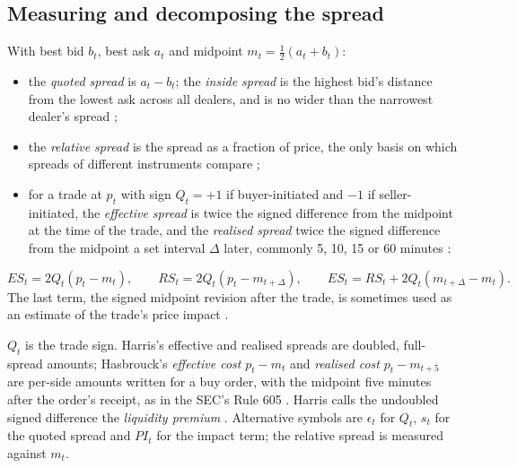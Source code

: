 \subsection{Measuring and decomposing the spread}

\begin{qfdefinition}\label{def:spread-measures}
 With best bid $b_t$, best ask $a_t$ and midpoint $m_t=\tfrac12(a_t+b_t)$:
\begin{itemize}
\item the \emph{quoted spread} is $a_t-b_t$; the \emph{inside spread} is the highest bid's distance from the lowest ask across all dealers, and is no wider than the narrowest dealer's spread \citep[chap.~``Dealers'', p.~280]{alpha-harris};
\item the \emph{relative spread} is the spread as a fraction of price, the only basis on which spreads of different instruments compare \citep[chap.~``Bid/Ask Spreads'', p.~312]{alpha-harris};
\item for a trade at $p_t$ with sign $Q_t=+1$ if buyer-initiated and $-1$ if seller-initiated, the \emph{effective spread} is twice the signed difference from the midpoint at the time of the trade, and the \emph{realised spread} twice the signed difference from the midpoint a set interval $\Delta$ later, commonly 5, 10, 15 or 60 minutes \citep[chap.~``Liquidity and Transaction Cost Measurement'', pp.~424--425]{alpha-harris}:
\end{itemize}
\[ ES_t=2Q_t(p_t-m_t), \qquad RS_t=2Q_t(p_t-m_{t+\Delta}), \qquad ES_t=RS_t+2Q_t(m_{t+\Delta}-m_t). \]
The last term, the signed midpoint revision after the trade, is sometimes used as an estimate of the trade's price impact \citep[sec.~14.2.2, eq.~(14.2), p.~148]{s6-hasbrouck}.

 $Q_t$ is the trade sign. Harris's effective and realised spreads are doubled, full-spread amounts; Hasbrouck's \emph{effective cost} $p_t-m_t$ and \emph{realised cost} $p_t-m_{t+5}$ are per-side amounts written for a buy order, with the midpoint five minutes after the order's receipt, as in the SEC's Rule 605 \citep[same sec., p.~148]{s6-hasbrouck}. Harris calls the undoubled signed difference the \emph{liquidity premium} \citep[chap.~``Liquidity and Transaction Cost Measurement'', p.~425]{alpha-harris}. Alternative symbols are $\epsilon_t$ for $Q_t$, $s_t$ for the quoted spread and $PI_t$ for the impact term; the relative spread is measured against $m_t$.


\end{qfdefinition}
